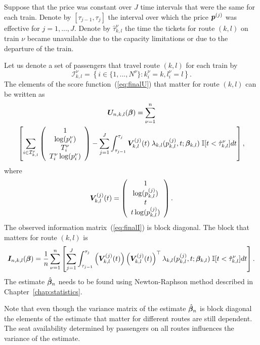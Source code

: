Suppose that the price was constant over $J$ time intervals that were the same for each train. Denote by $[ \tau_{j-1}, \tau_j ]$ the interval over which the price $\bm{p}^{(j)}$ was effective for $j = 1, ..., J$. Denote by $\hat{\tau}_{k,l}^{\nu}$ the time the tickets for route $(k,l)$ on train $\nu$ became unavailable due to the capacity limitations or due to the departure of the train.

Let us denote a set of passengers that travel route $(k,l)$ for each train by
\[
	\mathcal{I}_{k,l}^{\nu} = \left\{ i \in \{ 1, ..., N^{\nu} \} : k_i^\nu = k, l_i^\nu = l \right\}.
\]
The elements of the score function~(\ref{eq:finalU}) that matter for route $(k,l)$ can be written as
\begin{multline*}
	\bm{U}_{n,k,l} (\bm{\beta})
	= \sum_{\nu=1}^{n} \\
	\left[ \sum_{i \in \mathcal{I}_{k,l}^{\nu}} \left(
		\begin{array}{c}
			1 \\ \log(p_i^\nu) \\ T_i^\nu \\ T_i^\nu \log(p_i^\nu)
		\end{array}
	\right) - 
	\sum_{j=1}^J \int_{\tau_{j-1}}^{\tau_j} \bm{V}_{k,l}^{(j)} (t) \; \lambda_{k,l} (p_{k,l}^{(j)}, t; \bm{\beta}_{k,l}) \; \mathbb{I} [t < \hat{\tau}_{k,l}^{\nu}] dt \right],
\end{multline*}
where
\[
	\bm{V}_{k,l}^{(j)} (t) = \left(
		\begin{array}{c}
			1 \\ \log(p_{k,l}^{(j)}) \\ t \\ t \log(p_{k,l}^{(j)})
		\end{array}
	\right).
\]
The observed information matrix~(\ref{eq:finalI}) is block diagonal. The block that matters for route $(k,l)$ is
\[
	\bm{I}_{n,k,l} (\bm{\beta}) = \frac{1}{n} \sum_{\nu=1}^{n} \left[
	\sum_{j=1}^J \int_{\tau_{j-1}}^{\tau_j}
	\left(\bm{V}_{k,l}^{(j)} (t)  \right)
	\left(\bm{V}_{k,l}^{(j)} (t)  \right)^{\top}
	\lambda_{k,l} (p_{k,l}^{(j)}, t; \bm{\beta}_{k,l})
	\; \mathbb{I} [t < \hat{\tau}_{k,l}^{\nu}] dt \right].
\]
The estimate $\hat{\bm{\beta}}_n$ needs to be found using Newton-Raphson method described in Chapter~\ref{chap:statistics}.

Note that even though the variance matrix of the estimate $\hat{\bm{\beta}}_n$ is block diagonal the elements of the estimate that matter for different routes are still dependent. The seat availability determined by passengers on all routes influences the variance of the estimate.

